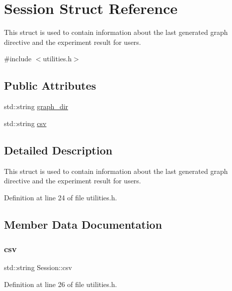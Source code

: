 \hypertarget{struct_session}{}\section{Session Struct Reference}
\label{struct_session}


This struct is used to contain information about the last generated graph directive and the experiment result for users.  




{\ttfamily \#include $<$utilities.\+h$>$}

\subsection*{Public Attributes}
\begin{DoxyCompactItemize}
\item 
std\+::string \hyperlink{struct_session_aecaa42a56f197e0874041533ccb358a6}{graph\+\_\+dir}
\item 
std\+::string \hyperlink{struct_session_a256b14530b834d61ce85bab451694b8c}{csv}
\end{DoxyCompactItemize}


\subsection{Detailed Description}
This struct is used to contain information about the last generated graph directive and the experiment result for users. 

Definition at line 24 of file utilities.\+h.



\subsection{Member Data Documentation}
\mbox{\label{struct_session_a256b14530b834d61ce85bab451694b8c}} 
\subsubsection{\texorpdfstring{csv}{csv}}
{\footnotesize\ttfamily std\+::string Session\+::csv}



Definition at line 26 of file utilities.\+h.

\mbox{\label{struct_session_aecaa42a56f197e0874041533ccb358a6}} 
